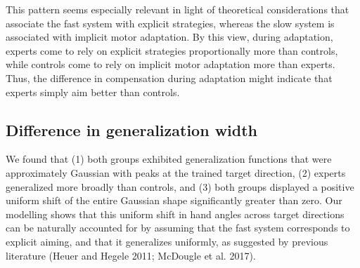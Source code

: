 \documentclass[jou, apacite, 11pt, longtable, floatsintext, notab]{apa6}
\begin{document}
This pattern seems especially relevant in light of
theoretical considerations that associate the fast system
with explicit strategies, whereas the slow system is
associated with implicit motor adaptation. By this view,
during adaptation, experts come to rely on explicit
strategies proportionally more than controls, while controls
come to rely on implicit motor adaptation more than experts.
Thus, the difference in compensation during adaptation might
indicate that experts simply aim better than controls.





\subsection{Difference in generalization width}
We found that (1) both groups exhibited generalization
functions that were approximately Gaussian with peaks at the
trained target direction, (2) experts generalized more
broadly than controls, and (3) both groups displayed a
positive uniform shift of the entire Gaussian shape
significantly greater than zero. Our modelling shows that
this uniform shift in hand angles across target directions
can be naturally accounted for by assuming that the fast
system corresponds to explicit aiming, and that it
generalizes uniformly, as suggested by previous literature
(Heuer and Hegele 2011; McDougle et al. 2017).
\end{document}
